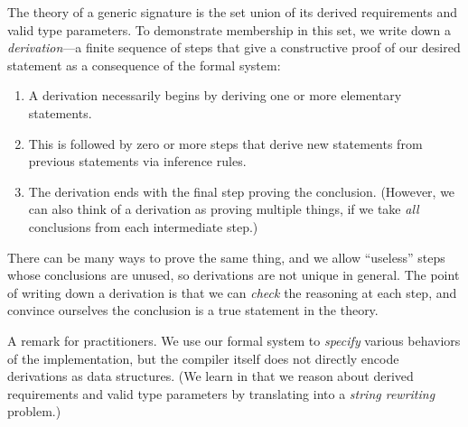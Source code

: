 \documentclass[../generics]{subfiles}
\begin{document}
The theory of a generic signature is the set union of its derived requirements and valid type parameters. To demonstrate membership in this set, we write down a \emph{derivation}---a finite sequence of steps that give a constructive proof of our desired statement as a consequence of the formal system:
\begin{enumerate}
\item A derivation necessarily begins by deriving one or more elementary statements.
\item This is followed by zero or more steps that derive new statements from previous statements via inference rules.
\item The derivation ends with the final step proving the conclusion. (However, we can also think of a derivation as proving multiple things, if we take \emph{all} conclusions from each intermediate step.)
\end{enumerate}
There can be many ways to prove the same thing, and we allow ``useless'' steps whose conclusions are unused, so derivations are not unique in general. The point of writing down a derivation is that we can \emph{check} the reasoning at each step, and convince ourselves the conclusion is a true statement in the theory.

A remark for practitioners. We use our formal system to \emph{specify} various behaviors of the implementation, but the compiler itself does not directly encode derivations as data structures. (We learn in  that we reason about derived requirements and valid type parameters by translating into a \emph{string rewriting} problem.)
\end{document}
